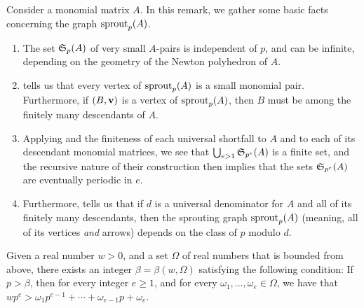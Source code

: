 \documentclass[11pt]{amsart}
\newcommand{\denom}{d}
\begin{document}
\begin{remark}
   \label{elementary1: R}
   Consider a monomial matrix $A$.
   In this remark, we gather some basic facts concerning the graph $\operatorname{sprout}_p(A)$.
\begin{enumerate} 
\item The set $\mathfrak{S}_p(A)$ of very small $A$-pairs is independent of $p$, and can be infinite, depending on the geometry of the Newton polyhedron of $A$.  

\item \label{elementary1 small pairs}  tells us that every vertex of $\operatorname{sprout}_p(A)$ is a small monomial pair.  Furthermore, if $(B,\mathbf{v})$ is a vertex of $\operatorname{sprout}_p(A)$, then $B$ must be among the finitely many descendants of $A$.

\item \label{elementary1 periodic in e} Applying  and the finiteness of each universal shortfall to $A$ and to each of its descendant monomial matrices, we see that $\bigcup_{e>1} \mathfrak{S}_{p^e}(A)$ is a finite set, and the recursive nature of their construction then implies that the sets $\mathfrak{S}_{p^e}(A)$ are eventually periodic in $e$.  

\item \label{elementary1 periodic in p} Furthermore,  tells us that if $\denom$ is a universal denominator for $A$ and all of its finitely many descendants, then the sprouting graph  $\operatorname{sprout}_p(A)$ (meaning, all of its vertices \emph{and} arrows) depends on the class of $p$ modulo $\denom$.
\end{enumerate}
\end{remark}


\begin{lemma}
   \label{positive-polynomial: L}
   Given a real number $w > 0$, and a set $\Omega$ of real numbers that is bounded from above, there exists an integer $\beta = \beta(w, \Omega)$ satisfying the following condition\textup:
   If $p > \beta$, then for every integer $e \geq 1$, and for every $\omega_1, \ldots, \omega_e \in \Omega$, we have that $wp^{e} >  \omega_1 p^{e-1} + \cdots + \omega_{e-1} p + \omega_e$.
\end{lemma}
\end{document}
